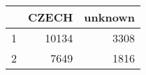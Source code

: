 \begin{table}[ht]
\centering
\begin{tabular}{rrr}
  \hline
 & CZECH & unknown \\ 
  \hline
1 & 10134 & 3308 \\ 
  2 & 7649 & 1816 \\ 
   \hline
\end{tabular}
\end{table}
